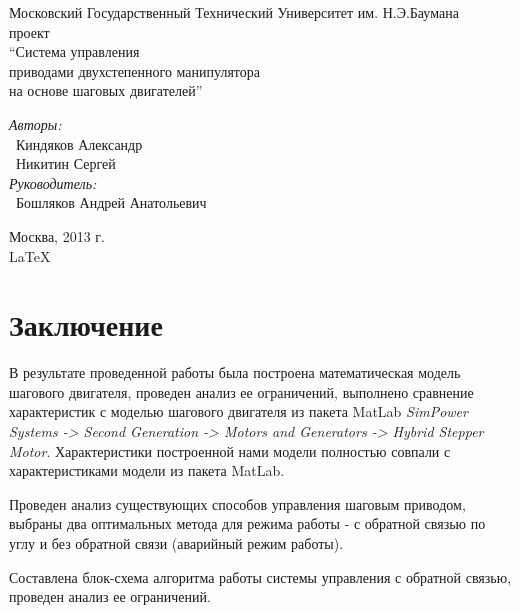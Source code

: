 \documentclass{article}
\begin{document}
\begin{titlepage}
\begin{center}
    {\large Московский Государственный Технический Университет им. Н.Э.Баумана}
    \\[50mm]
    { проект}
    \\[7mm]
    {\LARGE ``Система управления \\ приводами двухстепенного манипулятора \\ на основе шаговых двигателей''}
    \\[37mm]

    \begin{flushright}
        \begin{minipage}{0.5\textwidth}
            \begin{flushleft}
                \textit{Авторы:} \\
                ~Киндяков Александр \\
                ~Никитин Сергей \\[10mm]
                \textit{Руководитель:} \\
                ~Бошляков Андрей Анатольевич
            \end{flushleft}
        \end{minipage}
    \end{flushright}

    \vfill %
    Москва, 2013 г. \\
    \LaTeX
\end{center}
\end{titlepage}

\tableofcontents
\newpage







\newpage

\section{Заключение}

В результате проведенной работы была построена математическая модель шагового двигателя, проведен
анализ ее ограничений, выполнено сравнение характеристик с моделью шагового двигателя из пакета MatLab
\textit{SimPower Systems -> Second Generation -> Motors and Generators -> Hybrid Stepper Motor}.
Характеристики построенной нами модели полностью совпали с характеристиками модели из пакета MatLab.

Проведен анализ существующих способов управления шаговым приводом, выбраны два оптимальных метода для
режима работы - с обратной связью по углу и без обратной связи (аварийный режим работы).

Составлена блок-схема алгоритма работы системы управления с обратной связью, проведен анализ ее
ограничений.


\end{document}
